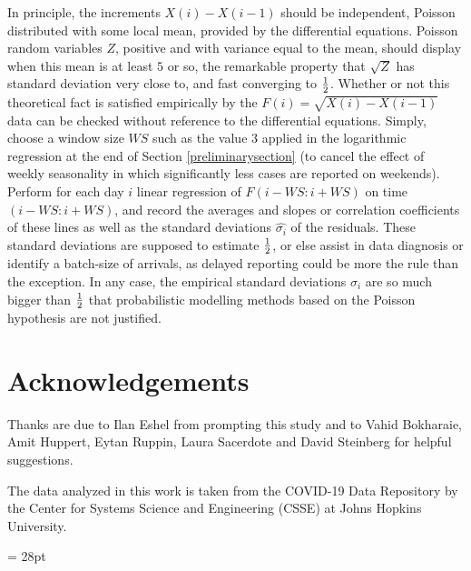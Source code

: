 \documentclass{article}
\begin{document}
In principle, the increments $X(i)-X(i-1)$ should be independent, Poisson distributed with some local mean, provided by the differential equations. Poisson random variables $Z$, positive and with variance equal to the mean, should display when this mean is at least $5$ or so, the remarkable property that $\sqrt{Z}$ has standard deviation very close to, and fast converging to ${1 \over 2}$. Whether or not this theoretical fact is satisfied empirically by the $F(i)=\sqrt{X(i)-X(i-1)}$ data can be checked without reference to the differential equations. Simply, choose a window size $WS$ such as the value $3$ applied in the logarithmic regression at the end of Section \ref{preliminarysection} (to cancel the effect of weekly seasonality in which significantly less cases are reported on weekends). Perform for each day $i$ linear regression of $F(i-WS:i+WS)$ on time $(i-WS:i+WS)$, and record the averages and slopes or correlation coefficients of these lines as well as the standard deviations $\hat{\sigma_i}$ of the residuals. These standard deviations are supposed to estimate ${1 \over 2}$, or else assist in data diagnosis or identify a batch-size of arrivals, as delayed reporting could be more the rule than the exception. In any case, the empirical standard deviations $\hat{\sigma_i}$ are so much bigger than ${1 \over 2}$ that probabilistic modelling methods based on the Poisson hypothesis are not justified.

\section*{Acknowledgements}

Thanks are due to Ilan Eshel from prompting this study and to Vahid
Bokharaie, Amit Huppert, Eytan Ruppin, Laura Sacerdote and David Steinberg for helpful suggestions.

The data analyzed in this work is taken from the COVID-19 Data Repository by
the Center for Systems Science and Engineering (CSSE) at Johns Hopkins
University.



\baselineskip= 28pt
\end{document}
